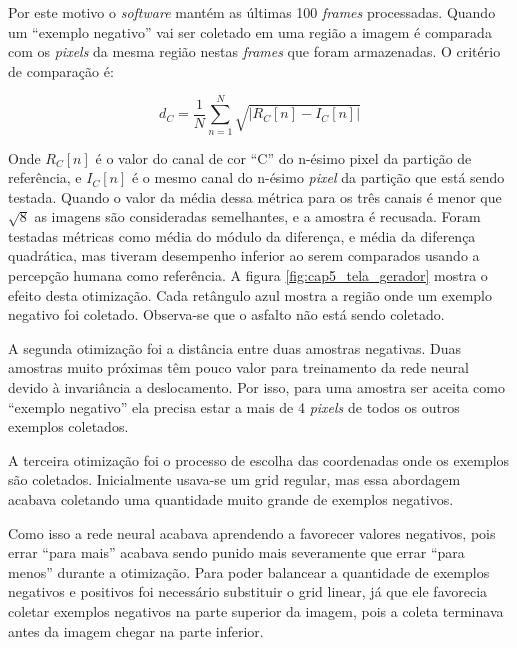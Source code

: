 Por este motivo o \emph{software} mantém as últimas 100 \emph{frames} processadas.
Quando um ``exemplo negativo'' vai ser coletado em uma região a imagem é
comparada com os \emph{pixels} da mesma região nestas \emph{frames} que foram
armazenadas. O critério de comparação é:

\begin{equation}
	d_C=\frac{1}{N} \sum_{n=1}^N \sqrt{\left| R_C [n] -I_C [n] \right|}
\end{equation}

Onde $R_C[n]$ é o valor do canal de cor ``C'' do n-ésimo pixel da partição de
referência, e $I_C[n]$ é o mesmo canal do n-ésimo \emph{pixel} da
partição que está sendo testada. Quando o valor da média dessa métrica
para os três canais é menor que $\sqrt{8}$ as imagens são consideradas
semelhantes, e a amostra é recusada. Foram
testadas métricas como média do módulo da diferença, e média da diferença
quadrática, mas tiveram desempenho inferior ao serem comparados usando a
percepção humana como referência. A figura
\ref{fig:cap5_tela_gerador} mostra o efeito desta otimização.
Cada retângulo azul mostra a região onde um exemplo negativo foi coletado.
Observa-se que o asfalto não está sendo coletado.

A segunda otimização foi a distância entre duas amostras negativas. Duas
amostras muito próximas têm pouco valor para treinamento da rede neural devido
à invariância a deslocamento. Por isso, para uma amostra ser aceita como
``exemplo negativo'' ela precisa estar a mais de 4 \emph{pixels} de todos os
outros exemplos coletados.

A terceira otimização foi o processo de escolha das coordenadas onde os
exemplos são coletados. Inicialmente usava-se um grid regular, mas essa
abordagem acabava coletando uma quantidade muito grande de exemplos negativos.

Como isso a rede neural acabava aprendendo a favorecer valores negativos, pois
errar ``para mais'' acabava sendo punido mais severamente que errar ``para
menos''
durante a otimização. Para poder balancear a quantidade de exemplos negativos e
positivos foi necessário substituir o grid linear, já que ele favorecia coletar
exemplos negativos na parte superior da imagem, pois a coleta terminava antes
da imagem chegar na parte inferior.

